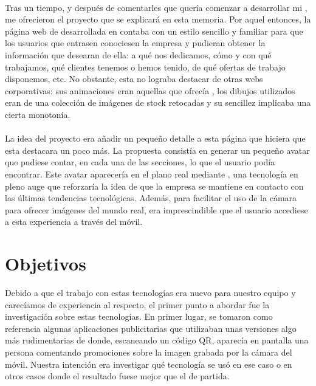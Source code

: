 \documentclass{subfiles}
\begin{document}
        \paragraph{}
        {Tras un tiempo, y después de comentarles que quería comenzar a desarrollar mi \TFG, me ofrecieron el proyecto que se explicará en esta memoria. Por aquel entonces, la página web de \silverstorm desarrollada en \wordpress contaba con un estilo sencillo y familiar para que los usuarios que entrasen conociesen la empresa y pudieran obtener la información que desearan de ella: a qué nos dedicamos, cómo y con qué trabajamos, qué clientes tenemos o hemos tenido, de qué ofertas de trabajo disponemos, etc. No obstante, esta no lograba destacar de otras webs corporativas: sus animaciones eran aquellas que ofrecía \wordpress, los dibujos utilizados eran de una colección de imágenes de stock retocadas y su sencillez implicaba una cierta monotonía.}
        
        \paragraph{}
        {La idea del proyecto era añadir un pequeño detalle a esta página que hiciera que esta destacara un poco más. La propuesta consistía en generar un pequeño avatar que pudiese contar, en cada una de las secciones, lo que el usuario podía encontrar. Este avatar aparecería en el plano real mediante \ra, una tecnología en pleno auge \cite{Xiong2021} que reforzaría la idea de que la empresa se mantiene en contacto con las últimas tendencias tecnológicas. Además, para facilitar el uso de la cámara para ofrecer imágenes del mundo real, era imprescindible que el usuario accediese a esta experiencia a través del móvil.}

        \section{Objetivos}
        \label{sec:1.2}

        {Debido a que el trabajo con estas tecnologías era nuevo para nuestro equipo y carecíamos de experiencia al respecto, el primer punto a abordar fue la investigación sobre estas tecnologías. En primer lugar, se tomaron como referencia algunas aplicaciones publicitarias que utilizaban unas versiones algo más rudimentarias de \ra donde, escaneando un código QR, aparecía en pantalla una persona comentando promociones sobre la imagen grabada por la cámara del móvil. Nuestra intención era investigar qué tecnología se usó en ese caso o en otros casos donde el resultado fuese mejor que el de partida.}
        
\end{document}
